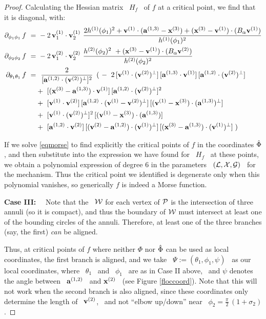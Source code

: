 \begin{proof}
Calculating the Hessian matrix \ $H_{f}$ \ of $f$ at a critical point,
we find that it is diagonal, with:
%
\begin{equation*}
%
\begin{split}
%
\diff{f}{\phi_{1}\phi_{1}}~=&~
-2\,\vj{1}_{1}\cdot\vj{1}_{2}~
\frac{2\hj{1}(\phi_{1})^{2}+\vj{1}\cdot(\aj{1,3}-\xj{3})+
(\xj{3}-\vj{1})\cdot(B_{\alpha}\vj{1})}{\hj{1}(\phi_{1})^{2}}\\
%
\diff{f}{\phi_{2}\phi_{2}}~=&~
-2\,\vj{2}_{1}\cdot\vj{2}_{2}~
\frac{\hj{2}(\phi_{2})^{2}~+(\xj{3}-\vj{1})\cdot(B_{\alpha}\vj{2})}
{\hj{2}(\phi_{2})^{2}}\\
%
\diff{f}{\theta_{1}\theta_{1}}~=&~
~\frac{2}{[\aj{1,2}\cdot\vp{2}]^{2}}\
\left(\right.
-~2\,[\vj{1}\cdot\vp{2}]\,[\aj{1,3}\cdot\vj{1}]\,[\aj{1,2}\cdot\vp{2}]\\
&+~[(\xj{3}-\aj{1,3})\cdot\vj{1}]\,[\aj{1,2}\cdot\vp{2}]^{2}\\
&+~[\vj{1}\cdot\vj{2}]\,[\aj{1,2}\cdot(\vj{1}-\vj{2})^{\perp}]\,
[(\vj{1}-\xj{3})\cdot(\aj{1,3})^{\perp}]\\
&+~[\vj{1}\cdot\vp{2}]^{2}\,[(\vj{1}-\xj{3})\cdot(\aj{1,3})]\\
&+~[\aj{1,2}\cdot\vj{2}]\,[(\vj{2}-\aj{1,2})\cdot\vp{1}]\,
[(\xj{3}-\aj{1,3})\cdot\vp{1}]\left.\right)
%
\end{split}
%
\end{equation*}

If we solve \eqref{eqmorse} to find
explicitly the critical points of $f$ in the coordinates $\hat{\Phi}$, and
then substitute into the expression we have found for  \
$H_{f}$ \ at these points, we obtain a polynomial expression of
degree $6$ in the parameters \ $(\mathcal{L},\mathcal{X},\mathcal{G})$ \ for the
mechanism. Thus the critical point we identified is degenerate only
when this polynomial vanishes, so generically $f$ is indeed a Morse
function\vsm.

\noindent\textbf{Case III:} \ \
Note that the \wspace\ $\mathcal{W}$ for each vertex of $\mathcal{P}$ is the intersection
of three annuli (so it is compact), and thus the boundary of $\mathcal{W}$
must intersect at least one of the bounding circles of the annuli.
Therefore, at least one of the three branches (say, the first)
\emph{can} be aligned.

Thus, at critical points of $f$ where neither $\Phi$ nor $\hat{\Phi}$ can be
used as local coordinates, the first branch is aligned, and we take \
$\Psi:=(\theta_{1},\phi_{1},\psi)$ \ as our local coordinates,
where \ $\theta_{1}$ \ and \ $\phi_{1}$ \ are as in Case II above, \ and
$\psi$ denotes the angle between \ $\mathbf{a}\sp{({1,2})}$ \ and $\mathbf{x}\sp{({2})}$ \ (see
Figure \ref{floccoord}). Note that this will not work when the second branch is
also aligned, since these coordinates only determine the length of \
$\mathbf{v}\sp{({2})}$, \ and not ``elbow up/down'' near \
$\phi_{2}=\frac{\pi}{2}\,(1+\sigma_{2})$.


\end{proof}
